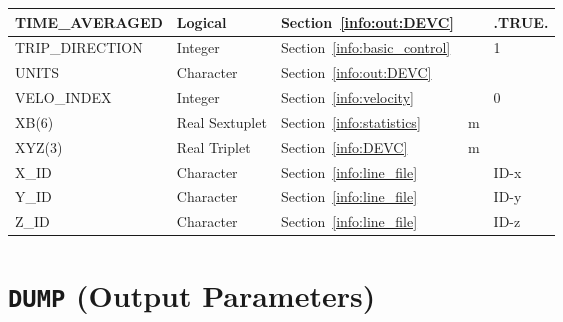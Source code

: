 \documentclass[11pt]{book}
\begin{document}
\begin{longtable}{@{\extracolsep{\fill}}|l|l|l|l|l|}
{\ct TIME\_AVERAGED}        & Logical         & Section~\ref{info:out:DEVC}                                     &       &  {\ct .TRUE.} \\ \hline
{\ct TRIP\_DIRECTION}       & Integer         & Section~\ref{info:basic_control}                                &       &  1            \\ \hline
{\ct UNITS}                 & Character       & Section~\ref{info:out:DEVC}                                     &       &               \\ \hline
{\ct VELO\_INDEX}           & Integer         & Section~\ref{info:velocity}                                     &       &  0            \\ \hline
{\ct XB(6)}                 & Real Sextuplet  & Section~\ref{info:statistics}                                   & m     &               \\ \hline
{\ct XYZ(3)}                & Real Triplet    & Section~\ref{info:DEVC}                                         & m     &               \\ \hline
{\ct X\_ID}                 & Character       & Section~\ref{info:line_file}                                    &       &  {\ct ID-x}   \\ \hline
{\ct Y\_ID}                 & Character       & Section~\ref{info:line_file}                                    &       &  {\ct ID-y}   \\ \hline
{\ct Z\_ID}                 & Character       & Section~\ref{info:line_file}                                    &       &  {\ct ID-z}   \\ \hline
\end{longtable}


\vspace{\baselineskip}



\section{\texorpdfstring{{\tt DUMP}}{DUMP} (Output Parameters)}
\end{document}

